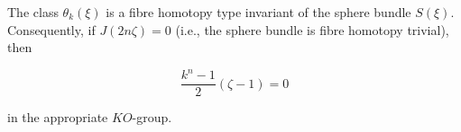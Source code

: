 The class $\theta_k(\xi)$ is a fibre homotopy type invariant of the sphere bundle $S(\xi)$. Consequently, if $J(2n\zeta) = 0$ (i.e., the sphere bundle is fibre homotopy trivial), then

$$
\frac{k^n - 1}{2}(\zeta - 1) = 0
$$

in the appropriate $KO$-group.
